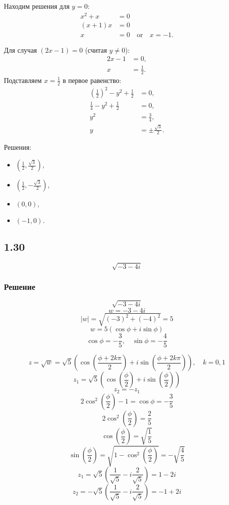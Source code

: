 \documentclass[12pt,a4paper]{article}
\begin{document}
Находим решения для \( y = 0 \):
\begin{align*}
x^2 + x &= 0 \\
(x + 1)x &= 0 \\
x &= 0 \quad \text{or} \quad x = -1.
\end{align*}

Для случая \( (2x-1) = 0 \) (считая \( y \neq 0 \)):
\begin{align*}
2x - 1 &= 0, \\
x &= \frac{1}{2}.
\end{align*}
Подставляем \( x = \frac{1}{2} \) в первое равенство:
\begin{align*}
\left(\frac{1}{2}\right)^2 - y^2 + \frac{1}{2} &= 0, \\
\frac{1}{4} - y^2 + \frac{1}{2} &= 0, \\
y^2 &= \frac{3}{4}, \\
y &= \pm \frac{\sqrt{3}}{2}.
\end{align*}

Решения:
\begin{itemize}
\item \((\frac{1}{2}, \frac{\sqrt{3}}{2})\),
\item \((\frac{1}{2}, -\frac{\sqrt{3}}{2})\),
\item \((0, 0)\),
\item \((-1, 0)\).
\end{itemize}
\subsection*{1.30}
\[
\sqrt{-3 - 4i}
\]
\subsubsection*{Решение}
\[
\sqrt{-3-4i}
\]
\[
w = -3 - 4i
\]
\[
|w| = \sqrt{(-3)^2 + (-4)^2} = 5
\]
\[
w = 5(\cos\phi + i\sin\phi)
\]
\[
\cos\phi = -\frac{3}{5}, \quad \sin\phi = -\frac{4}{5}
\]

\[
z=\sqrt{w} = \sqrt{5} \left( \cos \left( \frac{\phi + 2k\pi}{2} \right) + i\sin \left( \frac{\phi + 2k\pi}{2} \right) \right), \quad k = 0, 1
\]
\[
z_1 = \sqrt{5} \left( \cos \left( \frac{\phi}{2} \right) + i\sin \left( \frac{\phi}{2} \right) \right)
\]
\[
z_2=-z_1
\]
\[
2\cos^{2} \left( \frac{\phi}{2} \right) - 1 = \cos\phi = -\frac{3}{5}
\]
\[
2\cos^2 \left( \frac{\phi}{2} \right)  = \frac{2}{5}
\]
\[
\cos \left( \frac{\phi}{2} \right) = \sqrt{\frac{1}{5}}
\]
\[
\sin \left( \frac{\phi}{2} \right) = \sqrt{1 - \cos^2 \left( \frac{\phi}{2} \right)} = -\sqrt{\frac{4}{5}}
\]
\[
z_1 = \sqrt{5} \left( \frac{1}{\sqrt{5}} - i\frac{2}{\sqrt{5}} \right) = 1 - 2i
\]
\[
z_2 = -\sqrt{5} \left( \frac{1}{\sqrt{5}} - i\frac{2}{\sqrt{5}} \right) = -1 + 2i
\]
\end{document}
